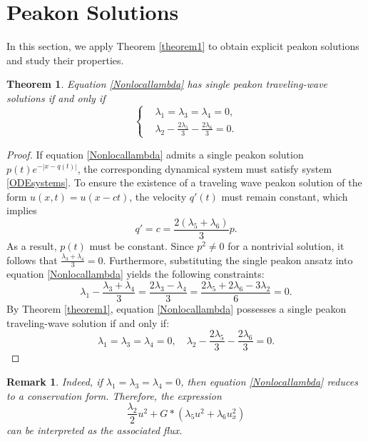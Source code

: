 \documentclass[11pt]{article}
\newtheorem{theorem}{Theorem}
\newtheorem{remark}{Remark}
\begin{document}
\section{Peakon Solutions}

In this section, we apply Theorem \ref{theorem1} to obtain explicit peakon solutions and study their properties.

\begin{theorem}
    Equation \eqref{Nonlocallambda} has single peakon traveling-wave solutions if and only if
    \begin{equation*}
    \left \{
        \begin{aligned}
            & \lambda_1 = \lambda_3 = \lambda_4 = 0,\\
            & \lambda_2- \frac{2\lambda_5}{3} - \frac{2\lambda_6}{3} = 0.
        \end{aligned}  \right.
    \end{equation*}
\end{theorem}

\begin{proof}
If equation \eqref{Nonlocallambda} admits a single peakon solution $p(t)e^{-|x-q(t)|}$, the corresponding dynamical system must
 satisfy system \eqref{ODEsystems}. To ensure the existence of a traveling wave peakon solution of the
form \( u(x,t) = u(x - ct) \), the velocity \( q'(t) \) must remain constant, which implies
\begin{equation*}
    q' = c = \frac{2(\lambda_5 + \lambda_6)}{3} p.
\end{equation*}
As a result, \( p(t) \) must be constant. Since \( p^2 \neq 0 \) for a nontrivial solution, it follows that $\frac{\lambda_3 + \lambda_4}{3} = 0$.
Furthermore, substituting the single peakon ansatz into equation \eqref{Nonlocallambda} yields the following
constraints:
\begin{equation*}
    \lambda_1 - \frac{\lambda_3+ \lambda_4}{3} = \frac{2\lambda_3 - \lambda_4}{3} = \frac{2\lambda_5 + 2\lambda_6 - 3\lambda_2}{6} = 0.
\end{equation*}
By Theorem \ref{theorem1}, equation \eqref{Nonlocallambda} possesses a single peakon traveling-wave
solution if and only if:
\begin{equation*}
    \lambda_1 = \lambda_3 = \lambda_4 = 0, \quad \lambda_2 - \frac{2\lambda_5}{3} - \frac{2\lambda_6}{3} = 0.
\end{equation*}
\end{proof}

\begin{remark}
Indeed, if $\lambda_1 = \lambda_3 = \lambda_4 = 0$, then equation \eqref{Nonlocallambda} reduces to a conservation form. Therefore, the expression
\begin{equation*}
\frac{\lambda_2}{2}u^2 + G \ast (\lambda_5 u^2 + \lambda_6 u_x^2)
\end{equation*}
can be interpreted as the associated flux.
\end{remark}
\end{document}
